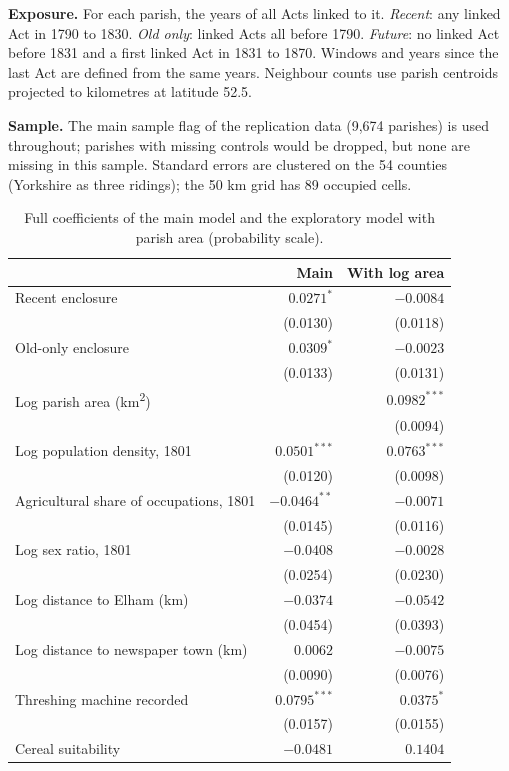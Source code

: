 \documentclass[11pt,a4paper]{article}
\begin{document}
\textbf{Exposure.} For each parish, the years of all Acts linked to it. \textit{Recent}: any linked Act in 1790 to 1830. \textit{Old only}: linked Acts all before 1790. \textit{Future}: no linked Act before 1831 and a first linked Act in 1831 to 1870. Windows and years since the last Act are defined from the same years. Neighbour counts use parish centroids projected to kilometres at latitude 52.5\textdegree.

\textbf{Sample.} The main sample flag of the replication data (9,674 parishes) is used throughout; parishes with missing controls would be dropped, but none are missing in this sample. Standard errors are clustered on the 54 counties (Yorkshire as three ridings); the 50 km grid has 89 occupied cells.

\begin{table}[tbp]\centering\small\caption{Full coefficients of the main model and the exploratory model with parish area (probability scale).}\label{tab:full}\begin{tabular}{lrr}\toprule & Main & With log area\\\midrule
Recent enclosure & $0.0271^{*}$ & $-0.0084$\\
 & (0.0130) & (0.0118)\\
Old-only enclosure & $0.0309^{*}$ & $-0.0023$\\
 & (0.0133) & (0.0131)\\
Log parish area (km\textsuperscript{2}) &  & $0.0982^{***}$\\
 &  & (0.0094)\\
Log population density, 1801 & $0.0501^{***}$ & $0.0763^{***}$\\
 & (0.0120) & (0.0098)\\
Agricultural share of occupations, 1801 & $-0.0464^{**}$ & $-0.0071$\\
 & (0.0145) & (0.0116)\\
Log sex ratio, 1801 & $-0.0408$ & $-0.0028$\\
 & (0.0254) & (0.0230)\\
Log distance to Elham (km) & $-0.0374$ & $-0.0542$\\
 & (0.0454) & (0.0393)\\
Log distance to newspaper town (km) & $0.0062$ & $-0.0075$\\
 & (0.0090) & (0.0076)\\
Threshing machine recorded & $0.0795^{***}$ & $0.0375^{*}$\\
 & (0.0157) & (0.0155)\\
Cereal suitability & $-0.0481$ & $0.1404$\\

\end{tabular}
\end{table}
\end{document}
